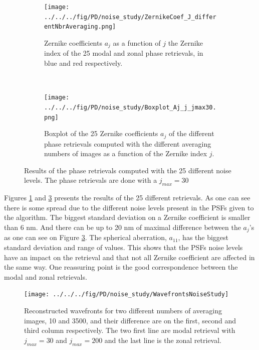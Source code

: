 \begin{figure}
\centering
    \begin{subfigure}{\textwidth}
        \texttt{[image: ../../../fig/PD/noise\_study/ZernikeCoef\_J\_differentNbrAveraging.png]}
        \caption{Zernike coefficients $a_j$ as a function of $j$ the Zernike index of the 25 modal and zonal phase retrievals, in blue and red respectively.}
        \label{subfig:ZernikeCoef_J_differentNbrAveragingjmax30}
    \end{subfigure}
    \\
    \begin{subfigure}{0.75\textwidth}
        \texttt{[image: ../../../fig/PD/noise\_study/Boxplot\_Aj\_j\_jmax30.png]}
        \caption{Boxplot of the 25 Zernike coefficients $a_j$ of the different phase retrievals computed with the different averaging numbers of images as a function of the Zernike index $j$.}
        \label{subfig:Boxplot_Aj_j_jmax30}
    \end{subfigure}
    \decoRule
    \caption{Results of the phase retrievals computed with the 25 different noise levels. The phase retrievals are done with a $j_{max} = 30$}
\end{figure}

Figures \ref{subfig:ZernikeCoef_J_differentNbrAveragingjmax30} and \ref{subfig:Boxplot_Aj_j_jmax30} presents the results of the 25 different retrievals. As one can see there is some spread due to the different noise levels present in the PSFs given to the algorithm. The biggest standard deviation on a Zernike coefficient is smaller than 6 nm. And there can be up to 20 nm of maximal difference between the $a_j$'s as one can see on Figure \ref{subfig:Boxplot_Aj_j_jmax30}. The spherical aberration, $a_{11}$, has the biggest standard deviation and range of values. This shows that the PSFs noise levels have an impact on the retrieval and that not all Zernike coefficient are affected in the same way. One reassuring point is the good correspondence between the modal and zonal retrievals.

\begin{figure}
\begin{center}
\texttt{[image: ../../../fig/PD/noise\_study/WavefrontsNoiseStudy]}
\decoRule
\caption{Reconstructed wavefronts for two different numbers of averaging images, 10 and 3500, and their difference are on the first, second and third column respectively. The two first line are modal retrieval with $j_{max}=30$ and $j_{max}=200$ and the last line is the zonal retrieval.}
\label{fig:WavefrontsNoiseStudy}
\end{center}
\end{figure}


